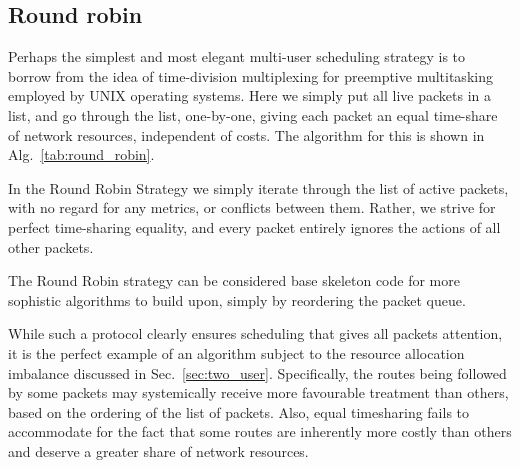 \documentclass[aps,rmp,twocolumn,amsmath,amssymb,nofootinbib,superscriptaddress,longbibliography,floatfix]{revtex4-1}
\begin{document}
\subsection{Round robin} \label{sec:round_robin}

Perhaps the simplest and most elegant multi-user scheduling strategy is to borrow from the idea of time-division multiplexing for preemptive multitasking employed by UNIX operating systems. Here we simply put all live packets in a list, and go through the list, one-by-one, giving each packet an equal time-share of network resources, independent of costs. The algorithm for this is shown in Alg.~\ref{tab:round_robin}.

\begin{table}[!htb]
\caption{In the {\sc Round Robin Strategy} we simply iterate through the list of active packets, with no regard for any metrics, or conflicts between them. Rather, we strive for perfect time-sharing equality, and every packet entirely ignores the actions of all other packets.} \label{tab:round_robin}
\end{table}
The {\sc Round Robin} strategy can be considered base skeleton code for more sophistic algorithms to build upon, simply by reordering the packet queue.

While such a protocol clearly ensures scheduling that gives all packets attention, it is the perfect example of an algorithm subject to the resource allocation imbalance discussed in Sec.~\ref{sec:two_user}. Specifically, the routes being followed by some packets may systemically receive more favourable treatment than others, based on the ordering of the list of packets. Also, equal timesharing fails to accommodate for the fact that some routes are inherently more costly than others and deserve a greater share of network resources.
\end{document}
